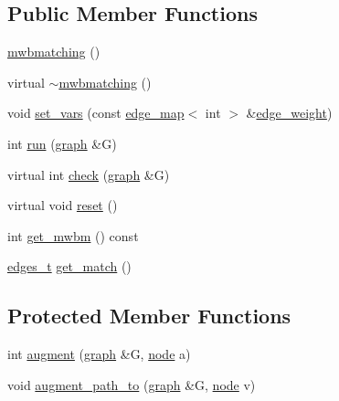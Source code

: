 \subsection*{Public Member Functions}
\begin{DoxyCompactItemize}
\item 
\mbox{\hyperlink{classmwbmatching_a360da276965377cb3e97461e2d207537}{mwbmatching}} ()
\item 
virtual \mbox{\hyperlink{classmwbmatching_a93190f5d39643b3b8a3067a07abd520b}{$\sim$mwbmatching}} ()
\item 
void \mbox{\hyperlink{classmwbmatching_a0547cf2f00854d2548613c39eaf400a9}{set\+\_\+vars}} (const \mbox{\hyperlink{classedge__map}{edge\+\_\+map}}$<$ int $>$ \&\mbox{\hyperlink{classmwbmatching_a9624508c4944bffc6a349aa76ce6964c}{edge\+\_\+weight}})
\item 
int \mbox{\hyperlink{classmwbmatching_adcb51caed21e77253940cd71bfd9a405}{run}} (\mbox{\hyperlink{classgraph}{graph}} \&G)
\item 
virtual int \mbox{\hyperlink{classmwbmatching_af6b9e6ad6e77958ddd32301df96bae23}{check}} (\mbox{\hyperlink{classgraph}{graph}} \&G)
\item 
virtual void \mbox{\hyperlink{classmwbmatching_acb2171f09442f1d4170eaed5dc213865}{reset}} ()
\item 
int \mbox{\hyperlink{classmwbmatching_a19c5144f8a7c44e238743e6eaff8c228}{get\+\_\+mwbm}} () const
\item 
\mbox{\hyperlink{edge_8h_a8f9587479bda6cf612c103494b3858e3}{edges\+\_\+t}} \mbox{\hyperlink{classmwbmatching_a30af3917c3d7257e4c13f0634c41d39d}{get\+\_\+match}} ()
\end{DoxyCompactItemize}
\subsection*{Protected Member Functions}
\begin{DoxyCompactItemize}
\item 
int \mbox{\hyperlink{classmwbmatching_adfb6ea829377c6ba08f6079d767d5a42}{augment}} (\mbox{\hyperlink{classgraph}{graph}} \&G, \mbox{\hyperlink{classnode}{node}} a)
\item 
void \mbox{\hyperlink{classmwbmatching_a241fe1b645070b1f3e96c0b100fb8a6f}{augment\+\_\+path\+\_\+to}} (\mbox{\hyperlink{classgraph}{graph}} \&G, \mbox{\hyperlink{classnode}{node}} v)
\end{DoxyCompactItemize}
